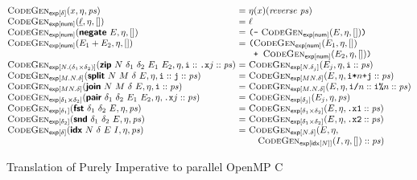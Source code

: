 \begin{figure}[H]
  \begin{minipage}{1.0\linewidth}
    \begin{displaymath}
      \begin{array}{@{}l@{~}c@{~}l@{}}
        \codegenExp{\delta}{x, \eta, \mathit{ps}}
        &=& \eta(x)(\mathit{reverse}~\mathit{ps})
        \\
        \codegenExp{\num}{\underline{\ell}, \eta, []}
        &=& \ell
        \\
        \codegenExp{\num}{\prim{negate}~E, \eta, []}
        &=& \texttt{(}\texttt{-}~\codegenExp{\num}{E, \eta, []}\texttt{)}
        \\
        \codegenExp{\num}{E_1 + E_2, \eta, []}
        &=& \texttt{(}
        \begin{array}[t]{@{}l}
          \codegenExp{\num}{E_1, \eta, []}\\
          \texttt{+ }\codegenExp{\num}{E_2, \eta, []}\texttt{)}
        \end{array}
        \\
        \codegenExp{N.(\delta_1 \times \delta_2)}{\prim{zip}~N~\delta_1~\delta_2~E_1~E_2, \eta, \texttt{i} :: \texttt{.x}j :: \mathit{ps}}
        &=& \codegenExp{N.\delta_j}{E_j, \eta, \texttt{i} :: \mathit{ps}}
        \\
        \codegenExp{M.N.\delta}{\prim{split}~N~M~\delta~E, \eta, \texttt{i} :: \texttt{j} :: \mathit{ps}}
        &=& \codegenExp{MN.\delta}{E, \eta, \texttt{i*}n\texttt{+j} :: \mathit{ps}}
        \\
        \codegenExp{MN.\delta}{\prim{join}~N~M~\delta~E, \eta, \texttt{i} :: \mathit{ps}}
        &=& \codegenExp{M.N.\delta}{E, \eta, \texttt{i/}n :: \texttt{i\%}n :: \mathit{ps}}
        \\
        \codegenExp{\delta_1 \times \delta_2}{\prim{pair}~\delta_1~\delta_2~E_1~E_2, \eta, \texttt{.x}j :: \mathit{ps}}
        &=& \codegenExp{\delta_j}{E_j, \eta, \mathit{ps}}
        \\
        \codegenExp{\delta_1}{\prim{fst}~\delta_1~\delta_2~E, \eta, \mathit{ps}}
        &=& \codegenExp{\delta_1 \times \delta_2}{E, \eta, \texttt{.x1} :: \mathit{ps}}
        \\
        \codegenExp{\delta_2}{\prim{snd}~\delta_1~\delta_2~E, \eta, \mathit{ps}}
        &=& \codegenExp{\delta_1 \times \delta_2}{E, \eta, \texttt{.x2} :: \mathit{ps}}
        \\
        \codegenExp{\delta}{\prim{idx}~N~\delta~E~I, \eta, \mathit{ps}}
        &=&
        \begin{array}[t]{@{}l}
          \textsc{CodeGen}_{\mathsf{exp}[N.\delta]}(E, \eta,\\ \quad\codegenExp{\tyidx[N]}{I, \eta, []} :: \mathit{ps})
        \end{array}
      \end{array}
    \end{displaymath}
    \label{fig:codegen-exp}
  \end{minipage}

  \caption{Translation of Purely Imperative \DPIA to parallel OpenMP C}
  \label{fig:codegen}
\end{figure}

